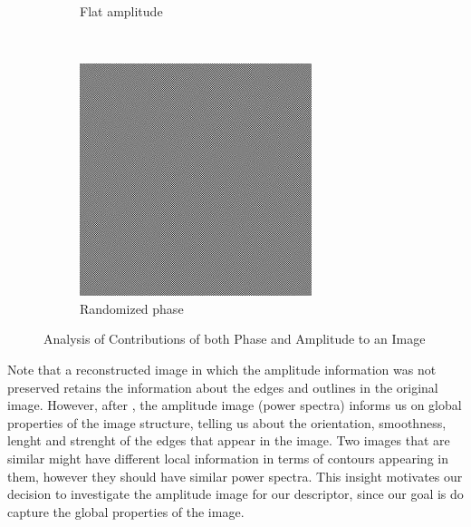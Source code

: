 \documentclass{report}
\begin{document}
\begin{figure}[H]
\begin{subfigure}[b]{0.2\textwidth}
                \caption{Flat amplitude}
                \label{fig:mouse}
        \end{subfigure}
        ~
        \begin{subfigure}[b]{0.2\textwidth}
                \includegraphics[width=\textwidth]{graphics/randomized_phase.jpg}
                \caption{Randomized phase}
                \label{fig:tiger}
        \end{subfigure}
        \caption{Analysis of Contributions of both Phase and Amplitude to an Image}\label{fig:fft_randomization}
\end{figure}
Note that a reconstructed image in which the amplitude information was not preserved retains the information about the edges and outlines in the original image. However, after \cite{gist_descriptor}, the amplitude image (power spectra) informs us on global properties of the image structure, telling us about the orientation, smoothness, lenght and strenght of the edges that appear in the image.
Two images that are similar might have different local information in terms of contours appearing in them, however they should have similar power spectra. This insight motivates our decision to investigate the amplitude image for our descriptor, since our goal is do capture the global properties of the image.
\end{document}
